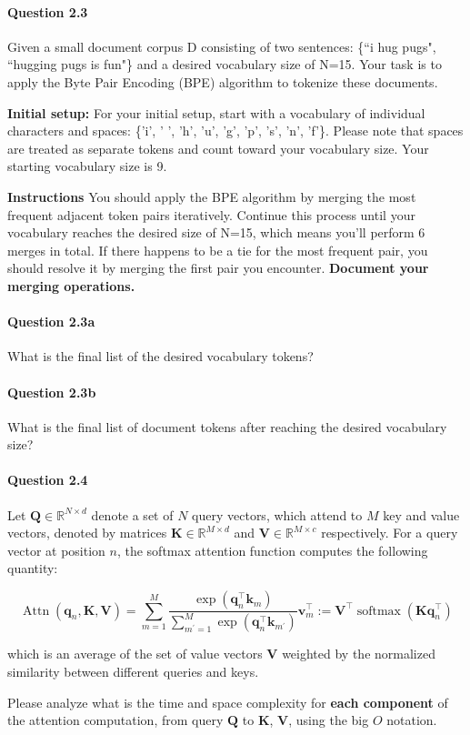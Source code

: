 \documentclass[10pt]{article}
\begin{document}
\paragraph{Question 2.3}
Given a small document corpus D consisting of two sentences: \{``i hug pugs", ``hugging pugs is fun"\} and a desired vocabulary size of N=15. Your task is to apply the Byte Pair Encoding (BPE) algorithm to tokenize these documents.

\textbf{Initial setup:} For your initial setup, start with a vocabulary of individual characters and spaces: \{'i', ' ', 'h', 'u', 'g', 'p', 's', 'n', 'f'\}. Please note that spaces are treated as separate tokens and count toward your vocabulary size. Your starting vocabulary size is 9.

\textbf{Instructions} You should apply the BPE algorithm by merging the most frequent adjacent token pairs iteratively. Continue this process until your vocabulary reaches the desired size of N=15, which means you'll perform 6 merges in total. If there happens to be a tie for the most frequent pair, you should resolve it by merging the first pair you encounter. \textbf{Document your merging operations.}

\paragraph{Question 2.3a} What is the final list of the desired vocabulary tokens?
\paragraph{Question 2.3b} What is the final list of document tokens after reaching the desired vocabulary size?

\paragraph{Question 2.4} Let $\mathbf{Q} \in \mathbb{R}^{N \times d}$ denote a set of $N$ query vectors, which attend to $M$ key and value vectors, denoted by matrices $\mathbf{K} \in \mathbb{R}^{M \times d}$ and $\mathbf{V} \in \mathbb{R}^{M \times c}$ respectively. For a query vector at position $n$, the softmax attention function computes the following quantity:

$$
  \operatorname{Attn}\left(\mathbf{q}_{n}, \mathbf{K}, \mathbf{V}\right)=\sum_{m=1}^{M} \frac{\exp \left(\mathbf{q}_{n}^{\top} \mathbf{k}_{m}\right)}{\sum_{m^{\prime}=1}^{M} \exp \left(\mathbf{q}_{n}^{\top} \mathbf{k}_{m^{\prime}}\right)} \mathbf{v}_{m}^{\top}:=\mathbf{V}^{\top} \operatorname{softmax}\left(\mathbf{K} \mathbf{q}_{n}^{\top}\right)
$$

which is an average of the set of value vectors $\mathbf{V}$ weighted by the normalized similarity between different queries and keys.

Please analyze what is the time and space complexity for \textbf{each component} of the attention computation, from query $\mathbf{Q}$ to $\mathbf{K}$, $\mathbf{V}$, using the big $O$ notation.
\end{document}
